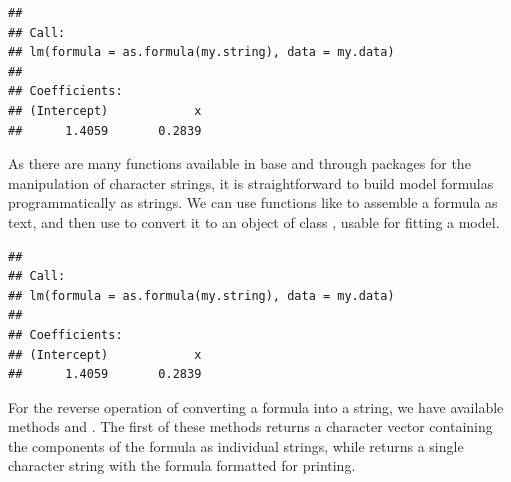 \documentclass[krantz2]{krantz}\usepackage{knitr}%
\begin{document}
\begin{explainbox}
\begin{knitrout}\footnotesize
{}\color{fgcolor}\begin{kframe}
\begin{alltt}
 \hlkwb{<-} 
\hlstd{(}  
\end{alltt}
\begin{verbatim}
## 
## Call:
## lm(formula = as.formula(my.string), data = my.data)
## 
## Coefficients:
## (Intercept)            x  
##      1.4059       0.2839
\end{verbatim}
\end{kframe}
\end{knitrout}

As there are many functions available in base \Rlang and through packages for the manipulation of character strings, it is straightforward to build model formulas programmatically as strings. We can use functions like  to assemble a formula as text, and then use  to convert it to an object of class , usable for fitting a model.

\begin{knitrout}\footnotesize
{}\color{fgcolor}\begin{kframe}
\begin{alltt}
 \hlkwb{<-} \hlstd{(}\hlstd{,} \hlstd{,}  \hlstd{=} \hlstd{)}
\hlstd{(}  
\end{alltt}
\begin{verbatim}
## 
## Call:
## lm(formula = as.formula(my.string), data = my.data)
## 
## Coefficients:
## (Intercept)            x  
##      1.4059       0.2839
\end{verbatim}
\end{kframe}
\end{knitrout}

For the reverse operation of converting a formula into a string, we have available methods  and . The first of these methods returns a character vector containing the components of the formula as individual strings, while  returns a single character string with the formula formatted for printing.


\end{explainbox}
\end{document}
